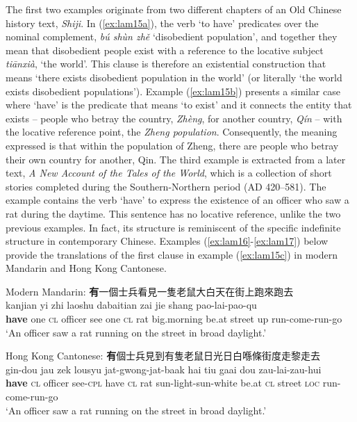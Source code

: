 \documentclass[output=paper]{langscibook}
\begin{document}
The first two examples originate from two different chapters of an Old Chinese history text, \emph{Shiji}. In (\ref{ex:lam15a}), the verb `to have' predicates over the nominal complement, \textit{bú shùn zhě} `disobedient population', and together they mean that disobedient people exist  with a reference to the locative subject \textit{tiānxià}, `the world'. This clause is therefore an existential construction that means `there exists disobedient population in the world' (or literally `the world exists disobedient populations'). Example (\ref{ex:lam15b}) presents a similar case where `have' is the predicate that means `to exist' and it connects the entity that exists – people who betray the country, \emph{Zhèng}, for another country, \emph{Qín} – with the locative reference point, the \emph{Zheng population}. Consequently, the meaning expressed is that within the population of Zheng, there are people who betray their own country for another, Qin. The third example is extracted from a later text, \emph{A New Account of the Tales of the World}, which is a collection of short stories completed during the Southern-Northern period (AD 420–581). The example contains the verb `have' to express the existence of an officer who saw a rat during the daytime. This sentence has no locative reference, unlike the two previous examples. In fact, its structure is reminiscent of the specific indefinite structure in contemporary Chinese. Examples (\ref{ex:lam16}-\ref{ex:lam17}) below provide the translations of the first clause in example (\ref{ex:lam15c}) in modern Mandarin and Hong Kong Cantonese. 

\ea Modern Mandarin: {\cn \textbf{有}一個士兵看見一隻老鼠大白天在街上跑來跑去} \label{ex:lam16}\\
   kanjian yi zhi laoshu dabaitian zai jie shang pao-lai-pao-qu\\
 \textbf{have} one \textsc{cl} officer see one \textsc{cl} rat big.morning be.at street	up run-come-run-go\\
  \glt `An officer saw a rat running on the street in broad daylight.'
\z 

\ea Hong Kong Cantonese: {\cn \textbf{有}個士兵見到有隻老鼠日光日白喺條街度走黎走去}\label{ex:lam17}\\
   gin-dou jau zek lousyu jat-gwong-jat-baak hai	tiu gaai dou zau-lai-zau-hui\\
	\textbf{have} \textsc{cl} officer see-\textsc{cpl} have \textsc{cl} rat sun-light-sun-white be.at \textsc{cl} street \textsc{loc} run-come-run-go\\
	\glt `An officer saw a rat running on the street in broad daylight.'
\z 
\end{document}
